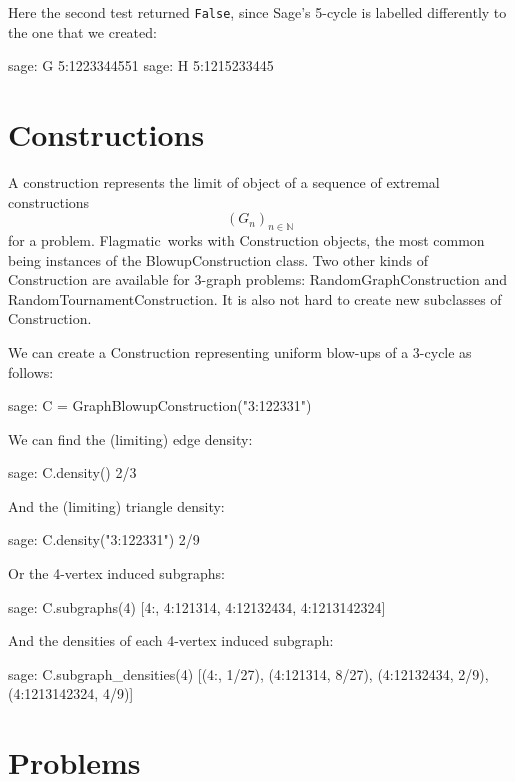 \documentclass{article}
\providecommand{\flagmatic}{Flagmatic}
\begin{document}
Here the second test returned \verb|False|, since Sage's 5-cycle is labelled differently to the one that we created:

\begin{sage}
sage: G
5:1223344551
sage: H
5:1215233445
\end{sage}

\section{Constructions}

A construction represents the limit of object of a sequence of extremal constructions
\[(G_n)_{n \in \mathbb{N}}\]
for a problem. \flagmatic\ works with Construction objects, the most common being instances of the BlowupConstruction class. Two other kinds of Construction are available for 3-graph problems: RandomGraphConstruction and RandomTournamentConstruction. It is also not hard to create new subclasses of Construction.

We can create a Construction representing uniform blow-ups of a 3-cycle as follows:

\begin{sage}
sage: C = GraphBlowupConstruction("3:122331")
\end{sage}

We can find the (limiting) edge density:

\begin{sage}
sage: C.density()
2/3
\end{sage}

And the (limiting) triangle density:

\begin{sage}
sage: C.density("3:122331")
2/9
\end{sage}

Or the 4-vertex induced subgraphs:

\begin{sage}
sage: C.subgraphs(4)
[4:, 4:121314, 4:12132434, 4:1213142324]
\end{sage}

And the densities of each 4-vertex induced subgraph:

\begin{sage}
sage: C.subgraph_densities(4)
[(4:, 1/27), (4:121314, 8/27), (4:12132434, 2/9), (4:1213142324, 4/9)]
\end{sage}

\section{Problems}
\end{document}
